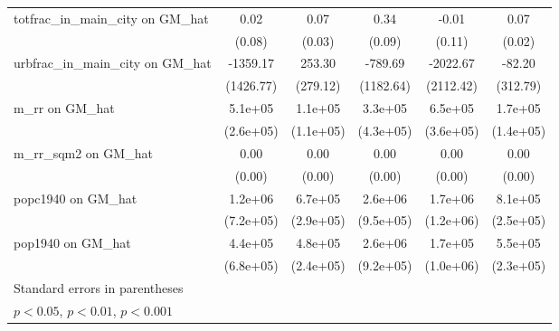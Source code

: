 \begin{table}[htbp]
\begin{tabular}{l*{5}{c}}
\addlinespace
totfrac\_in\_main\_city on GM\_hat&     0.02         &     0.07\sym{**} &     0.34\sym{***}&    -0.01         &     0.07\sym{**} \\
                &   (0.08)         &   (0.03)         &   (0.09)         &   (0.11)         &   (0.02)         \\
\addlinespace
urbfrac\_in\_main\_city on GM\_hat& -1359.17         &   253.30         &  -789.69         & -2022.67         &   -82.20         \\
                &(1426.77)         & (279.12)         &(1182.64)         &(2112.42)         & (312.79)         \\
\addlinespace
m\_rr on GM\_hat  &  5.1e+05\sym{*}  &  1.1e+05         &  3.3e+05         &  6.5e+05         &  1.7e+05         \\
                &(2.6e+05)         &(1.1e+05)         &(4.3e+05)         &(3.6e+05)         &(1.4e+05)         \\
\addlinespace
m\_rr\_sqm2 on GM\_hat&     0.00         &     0.00\sym{**} &     0.00\sym{**} &     0.00         &     0.00\sym{**} \\
                &   (0.00)         &   (0.00)         &   (0.00)         &   (0.00)         &   (0.00)         \\
\addlinespace
popc1940 on GM\_hat&  1.2e+06         &  6.7e+05\sym{*}  &  2.6e+06\sym{**} &  1.7e+06         &  8.1e+05\sym{**} \\
                &(7.2e+05)         &(2.9e+05)         &(9.5e+05)         &(1.2e+06)         &(2.5e+05)         \\
\addlinespace
pop1940 on GM\_hat&  4.4e+05         &  4.8e+05\sym{*}  &  2.6e+06\sym{**} &  1.7e+05         &  5.5e+05\sym{*}  \\
                &(6.8e+05)         &(2.4e+05)         &(9.2e+05)         &(1.0e+06)         &(2.3e+05)         \\
\bottomrule
\multicolumn{6}{l}{\footnotesize Standard errors in parentheses}\\
\multicolumn{6}{l}{\footnotesize \sym{*} \(p<0.05\), \sym{**} \(p<0.01\), \sym{***} \(p<0.001\)}\\
\end{tabular}
\end{table}
